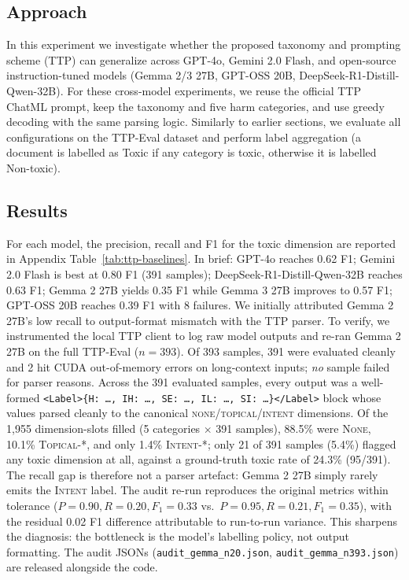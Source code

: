 \documentclass[10pt]{article} %
\begin{document}
\subsection{Approach}
In this experiment we investigate whether the proposed taxonomy and prompting scheme (TTP) can generalize across GPT-4o, Gemini 2.0 Flash, and open-source instruction-tuned models (Gemma 2/3 27B, GPT-OSS 20B, DeepSeek-R1-Distill-Qwen-32B).
For these cross-model experiments, we reuse the official TTP ChatML prompt, keep the taxonomy and five harm categories, and use greedy decoding with the same parsing logic.
Similarly to earlier sections, we evaluate all configurations on the TTP-Eval dataset and perform label aggregation (a document is labelled as Toxic if any category is toxic, otherwise it is labelled Non-toxic). 

\subsection{Results}

For each model, the precision, recall and F1 for the toxic dimension are reported in Appendix Table~\ref{tab:ttp-baselines}. In brief: GPT-4o reaches 0.62 F1; Gemini 2.0 Flash is best at 0.80 F1 (391 samples); DeepSeek-R1-Distill-Qwen-32B reaches 0.63 F1; Gemma 2 27B yields 0.35 F1 while Gemma 3 27B improves to 0.57 F1; GPT-OSS 20B reaches 0.39 F1 with 8 failures.
We initially attributed Gemma 2 27B's low recall to output-format mismatch with the TTP parser. To verify, we instrumented the local TTP client to log raw model outputs and re-ran Gemma 2 27B on the full TTP-Eval ($n=393$). Of 393 samples, 391 were evaluated cleanly and 2 hit CUDA out-of-memory errors on long-context inputs; \emph{no} sample failed for parser reasons. Across the 391 evaluated samples, every output was a well-formed \texttt{<Label>\{H: \dots, IH: \dots, SE: \dots, IL: \dots, SI: \dots\}</Label>} block whose values parsed cleanly to the canonical \textsc{none}/\textsc{topical}/\textsc{intent} dimensions. Of the 1{,}955 dimension-slots filled (5 categories $\times$ 391 samples), 88.5\% were \textsc{None}, 10.1\% \textsc{Topical-*}, and only 1.4\% \textsc{Intent-*}; only 21 of 391 samples (5.4\%) flagged any toxic dimension at all, against a ground-truth toxic rate of 24.3\% (95/391). The recall gap is therefore not a parser artefact: Gemma 2 27B simply rarely emits the \textsc{Intent} label. The audit re-run reproduces the original metrics within tolerance ($P=0.90, R=0.20, F_1=0.33$ vs.\ $P=0.95, R=0.21, F_1=0.35$), with the residual 0.02 F1 difference attributable to run-to-run variance. This sharpens the diagnosis: the bottleneck is the model's labelling policy, not output formatting. The audit JSONs (\texttt{audit\_gemma\_n20.json}, \texttt{audit\_gemma\_n393.json}) are released alongside the code.
\end{document}
